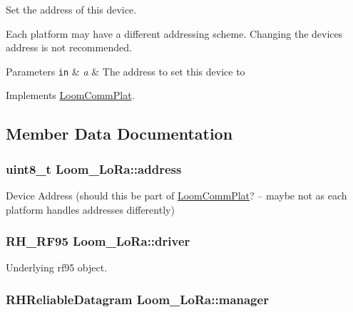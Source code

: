 Set the address of this device. 

Each platform may have a different addressing scheme. Changing the device\textquotesingle{}s address is not recommended. 
\begin{DoxyParams}[1]{Parameters}
\mbox{\tt in}  & {\em a} & The address to set this device to \\
\hline
\end{DoxyParams}


Implements \hyperlink{class_loom_comm_plat_afa0f66b4e657effefc34fa5a74363174}{Loom\+Comm\+Plat}.



\subsection{Member Data Documentation}
\subsubsection[{\texorpdfstring{address}{address}}]{\setlength{\rightskip}{0pt plus 5cm}uint8\+\_\+t Loom\+\_\+\+Lo\+Ra\+::address\hspace{0.3cm}{\ttfamily [protected]}}\hypertarget{class_loom___lo_ra_a22a97e267e96a09325ab02ea0ae49f5b}{}\label{class_loom___lo_ra_a22a97e267e96a09325ab02ea0ae49f5b}


Device Address (should this be part of \hyperlink{class_loom_comm_plat}{Loom\+Comm\+Plat}? – maybe not as each platform handles addresses differently) 

\subsubsection[{\texorpdfstring{driver}{driver}}]{\setlength{\rightskip}{0pt plus 5cm}R\+H\+\_\+\+R\+F95 Loom\+\_\+\+Lo\+Ra\+::driver\hspace{0.3cm}{\ttfamily [protected]}}\hypertarget{class_loom___lo_ra_ab600601fa4ec84c05f34d448dd2787e6}{}\label{class_loom___lo_ra_ab600601fa4ec84c05f34d448dd2787e6}


Underlying rf95 object. 

\subsubsection[{\texorpdfstring{manager}{manager}}]{\setlength{\rightskip}{0pt plus 5cm}R\+H\+Reliable\+Datagram Loom\+\_\+\+Lo\+Ra\+::manager\hspace{0.3cm}{\ttfamily [protected]}}\hypertarget{class_loom___lo_ra_a2d9e2b37554094a3ced44c213b433cd2}{}\label{class_loom___lo_ra_a2d9e2b37554094a3ced44c213b433cd2}


